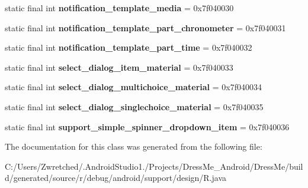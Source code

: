 \begin{DoxyCompactItemize}
\item 
\hypertarget{classandroid_1_1support_1_1design_1_1_r_1_1layout_af6499fd4c261801e10b2e023556ceb2e}{}static final int {\bfseries notification\+\_\+template\+\_\+media} = 0x7f040030\label{classandroid_1_1support_1_1design_1_1_r_1_1layout_af6499fd4c261801e10b2e023556ceb2e}

\item 
\hypertarget{classandroid_1_1support_1_1design_1_1_r_1_1layout_adbf595dcbbe5468a640c75da765e94c5}{}static final int {\bfseries notification\+\_\+template\+\_\+part\+\_\+chronometer} = 0x7f040031\label{classandroid_1_1support_1_1design_1_1_r_1_1layout_adbf595dcbbe5468a640c75da765e94c5}

\item 
\hypertarget{classandroid_1_1support_1_1design_1_1_r_1_1layout_a207f018f5184f266fb707b3c42dff303}{}static final int {\bfseries notification\+\_\+template\+\_\+part\+\_\+time} = 0x7f040032\label{classandroid_1_1support_1_1design_1_1_r_1_1layout_a207f018f5184f266fb707b3c42dff303}

\item 
\hypertarget{classandroid_1_1support_1_1design_1_1_r_1_1layout_aab2090fcba37187805603c08746aa8cc}{}static final int {\bfseries select\+\_\+dialog\+\_\+item\+\_\+material} = 0x7f040033\label{classandroid_1_1support_1_1design_1_1_r_1_1layout_aab2090fcba37187805603c08746aa8cc}

\item 
\hypertarget{classandroid_1_1support_1_1design_1_1_r_1_1layout_a3d2eb3f803ab59c599c7022c15479bb8}{}static final int {\bfseries select\+\_\+dialog\+\_\+multichoice\+\_\+material} = 0x7f040034\label{classandroid_1_1support_1_1design_1_1_r_1_1layout_a3d2eb3f803ab59c599c7022c15479bb8}

\item 
\hypertarget{classandroid_1_1support_1_1design_1_1_r_1_1layout_af908cc6a223fbe33d22bb3088dfc11b2}{}static final int {\bfseries select\+\_\+dialog\+\_\+singlechoice\+\_\+material} = 0x7f040035\label{classandroid_1_1support_1_1design_1_1_r_1_1layout_af908cc6a223fbe33d22bb3088dfc11b2}

\item 
\hypertarget{classandroid_1_1support_1_1design_1_1_r_1_1layout_a4de293b6e7223138532dd164026cd9c6}{}static final int {\bfseries support\+\_\+simple\+\_\+spinner\+\_\+dropdown\+\_\+item} = 0x7f040036\label{classandroid_1_1support_1_1design_1_1_r_1_1layout_a4de293b6e7223138532dd164026cd9c6}

\end{DoxyCompactItemize}


The documentation for this class was generated from the following file\+:\begin{DoxyCompactItemize}
\item 
C\+:/\+Users/\+Zwretched/.\+Android\+Studio1./\+Projects/\+Dress\+Me\+\_\+\+Android/\+Dress\+Me/build/generated/source/r/debug/android/support/design/R.\+java\end{DoxyCompactItemize}
